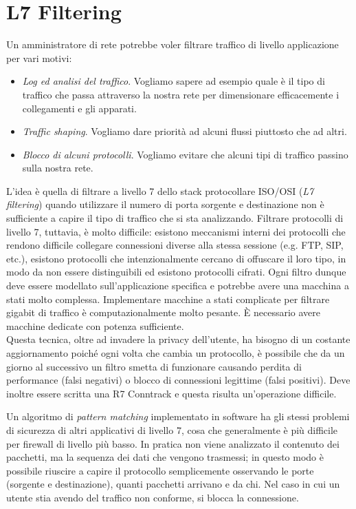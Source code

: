\section{L7 Filtering}
Un amministratore di rete potrebbe voler filtrare traffico di livello applicazione per vari motivi:
\begin{itemize}
	\item \textit{Log ed analisi del traffico}. Vogliamo sapere ad esempio quale è il tipo di traffico che passa attraverso la nostra rete per dimensionare efficacemente i collegamenti e gli apparati.
	\item \textit{Traffic shaping}. Vogliamo dare priorità ad alcuni flussi piuttosto che ad altri.
	\item \textit{Blocco di alcuni protocolli}. Vogliamo evitare che alcuni tipi di traffico passino sulla nostra rete.
\end{itemize}
L'idea è quella di filtrare a livello 7 dello stack protocollare ISO/OSI (\textit{L7 filtering}) quando utilizzare il numero di porta sorgente e destinazione non è sufficiente a capire il tipo di traffico che si sta analizzando. Filtrare protocolli di livello 7, tuttavia, è molto difficile: esistono meccanismi interni dei protocolli che rendono difficile collegare connessioni diverse alla stessa sessione (e.g. FTP, SIP, etc.), esistono protocolli che intenzionalmente cercano di offuscare il loro tipo, in modo da non essere distinguibili ed esistono protocolli cifrati. Ogni filtro dunque deve essere modellato sull'applicazione specifica e potrebbe avere una macchina a stati molto complessa. Implementare macchine a stati complicate per filtrare gigabit di traffico è computazionalmente molto pesante. È necessario avere macchine dedicate con potenza sufficiente.\\
Questa tecnica, oltre ad invadere la privacy dell'utente, ha bisogno di un costante aggiornamento poiché ogni volta che cambia un protocollo, è possibile che da un giorno al successivo un filtro smetta di funzionare causando perdita di performance (falsi negativi) o blocco di connessioni legittime (falsi positivi). Deve inoltre essere scritta una R7 Conntrack e questa risulta un'operazione difficile.

Un algoritmo di \textit{pattern matching} implementato in software ha gli stessi problemi di sicurezza di altri applicativi di livello 7, cosa che generalmente è più difficile per firewall di livello più basso. In pratica non viene analizzato il contenuto dei pacchetti, ma la sequenza dei dati che vengono trasmessi; in questo modo è possibile riuscire a capire il protocollo semplicemente osservando le porte (sorgente e destinazione), quanti pacchetti arrivano e da chi. Nel caso in cui un utente stia avendo del traffico non conforme, si blocca la connessione.

